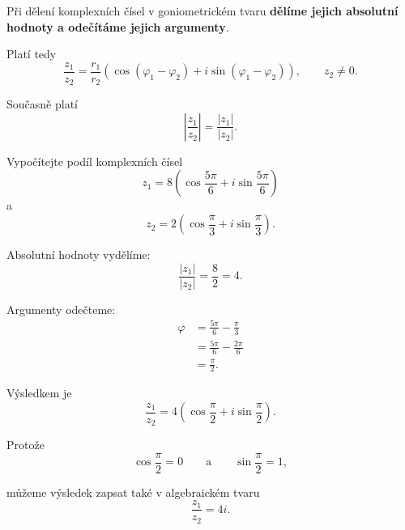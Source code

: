 \documentclass[12pt,a4paper]{article}
\begin{document}
\begin{notebox}
    Při dělení komplexních čísel v goniometrickém tvaru
    \textbf{dělíme jejich absolutní hodnoty a odečítáme jejich argumenty}.

    Platí tedy
    \[
        \frac{z_1}{z_2} = \frac{r_1}{r_2}   \left(
                                                \cos(\varphi_1-\varphi_2)
                                                +
                                                i\sin(\varphi_1-\varphi_2)
                                            \right),
        \qquad z_2\neq0.
    \]

    Současně platí
    \[
        \left| \frac{z_1}{z_2} \right| = \frac{|z_1|}{|z_2|}.
    \]
\end{notebox}


\begin{examplebox}
    Vypočítejte podíl komplexních čísel
    \[
        z_1 = 8 \left(
                    \cos\frac{5\pi}{6}
                    +
                    i\sin\frac{5\pi}{6}
                \right)
    \]
    a
    \[
        z_2 = 2 \left(
                    \cos\frac{\pi}{3}
                    +
                    i\sin\frac{\pi}{3}
                \right).
    \]

    Absolutní hodnoty vydělíme:
    \[
        \frac{|z_1|}{|z_2|} = \frac{8}{2} = 4.
    \]

    Argumenty odečteme:
    \begin{align*}
        \varphi &= \frac{5\pi}{6} - \frac{\pi}{3} \\
                &= \frac{5\pi}{6} - \frac{2\pi}{6} \\
                &= \frac{\pi}{2}.
    \end{align*}

    Výsledkem je
    \[
        \frac{z_1}{z_2} = 4 \left(
                                \cos\frac{\pi}{2}
                                +
                                i\sin\frac{\pi}{2}
                            \right).
    \]

    Protože
    \[
        \cos\frac{\pi}{2}=0 \qquad\text{a}\qquad \sin\frac{\pi}{2}=1,
    \]

    můžeme výsledek zapsat také v algebraickém tvaru
    \[
        \frac{z_1}{z_2}=4i.
    \]
\end{examplebox}
\end{document}
